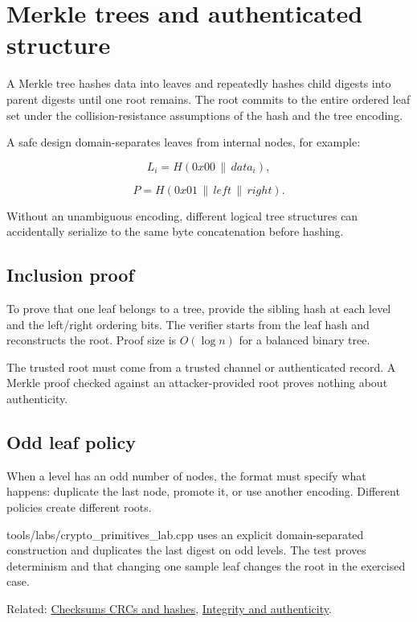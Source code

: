 \hypertarget{appendix-098192f8d46d}{}\label{referencestart:appendix-098192f8d46d}
\section{Merkle trees and authenticated structure}\label{appendix-098192f8d46d-merkle-trees-and-authenticated-structure}

\hypertarget{appendix-098192f8d46d-merkle-trees-and-authenticated-structure}{}

A Merkle tree hashes data into leaves and repeatedly hashes child digests into parent digests until one root remains. The root commits to the entire ordered leaf set under the collision-resistance assumptions of the hash and the tree encoding.

A safe design domain-separates leaves from internal nodes, for example:

\[
L_i=H(0x00\,\|\,data_i),
\]

\[
P=H(0x01\,\|\,left\,\|\,right).
\]

Without an unambiguous encoding, different logical tree structures can accidentally serialize to the same byte concatenation before hashing.

\subsection{Inclusion proof}\label{appendix-098192f8d46d-inclusion-proof}

\hypertarget{appendix-098192f8d46d-inclusion-proof}{}

To prove that one leaf belongs to a tree, provide the sibling hash at each level and the left/right ordering bits. The verifier starts from the leaf hash and reconstructs the root. Proof size is \(O(\log n)\) for a balanced binary tree.

The trusted root must come from a trusted channel or authenticated record. A Merkle proof checked against an attacker-provided root proves nothing about authenticity.

\subsection{Odd leaf policy}\label{appendix-098192f8d46d-odd-leaf-policy}

\hypertarget{appendix-098192f8d46d-odd-leaf-policy}{}

When a level has an odd number of nodes, the format must specify what happens: duplicate the last node, promote it, or use another encoding. Different policies create different roots.

tools/labs/crypto\_primitives\_lab.cpp uses an explicit domain-separated construction and duplicates the last digest on odd levels. The test proves determinism and that changing one sample leaf changes the root in the exercised case.

Related: \hyperref[appendix-ed338677de0a]{Checksums CRCs and hashes}, \hyperref[appendix-cbe594d1ab0a]{Integrity and authenticity}.
